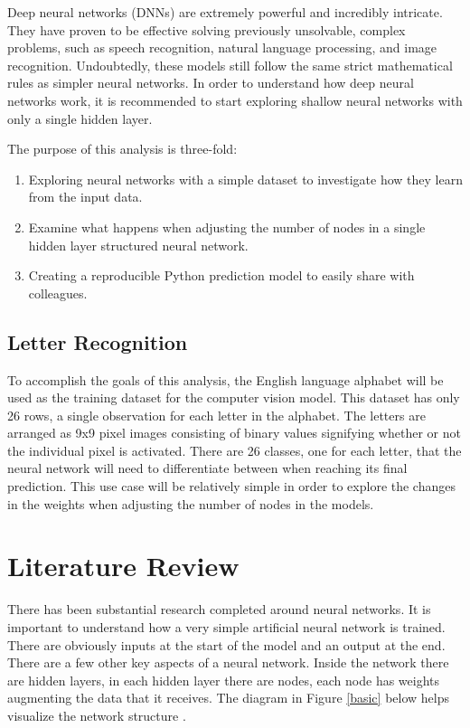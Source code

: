 \documentclass[5p,authoryear]{elsarticle}
\begin{document}
Deep neural networks (DNNs) are extremely powerful and incredibly intricate. 
They have proven to be effective solving previously unsolvable, complex problems, such as speech recognition, natural language processing, and image recognition. 
Undoubtedly, these models still follow the same strict mathematical rules as simpler neural networks. 
In order to understand how deep neural networks work, it is recommended to start exploring shallow neural networks with only a single hidden layer.

The purpose of this analysis is three-fold:
\begin{enumerate}
 \item Exploring neural networks with a simple dataset to investigate how they learn from the input data.
 \item Examine what happens when adjusting the number of nodes in a single hidden layer structured neural network.
 \item Creating a reproducible Python prediction model to easily share with colleagues. 
\end{enumerate} 


\subsection{Letter Recognition}

To accomplish the goals of this analysis, the English language alphabet will be used as the training dataset for the computer vision model. 
This dataset has only 26 rows, a single observation for each letter in the alphabet. 
The letters are arranged as 9x9 pixel images consisting of binary values signifying whether or not the individual pixel is activated. 
There are 26 classes, one for each letter, that the neural network will need to differentiate between when reaching its final prediction. 
This use case will be relatively simple in order to explore the changes in the weights when adjusting the number of nodes in the models.


\section{Literature Review}\label{lit_rev}

There has been substantial research completed around neural networks. 
It is important to understand how a very simple artificial neural network is trained. 
There are obviously inputs at the start of the model and an output at the end. 
There are a few other key aspects of a neural network. 
Inside the network there are hidden layers, in each hidden layer there are nodes, each node has weights augmenting the data that it receives. 
The diagram in Figure \ref{basic} below helps visualize the network structure \citep{Python}.\\
\end{document}
